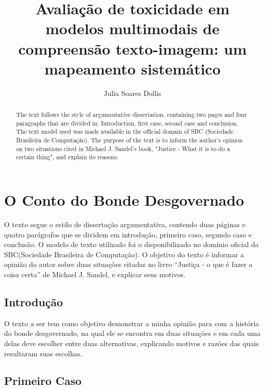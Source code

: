 \documentclass[12pt]{article}
\title{Avaliação de toxicidade em modelos multimodais de compreensão texto-imagem: um mapeamento sistemático}
\author{Julia Soares Dollis\inst{1} }
\begin{document}
 

\maketitle

\section{O Conto do Bonde Desgovernado} 

\begin{abstract}
  The text follows the style of argumentative dissertation, containing two pages and     four paragraphs that are divided in: Introduction, first case, second case and         conclusion. The text model used was made available in the official domain of SBC       (Sociedade Brasileira de Computação). The purpose of the text is to inform the         author's opinion on two situations cited in Michael J. Sandel's book, "Justice -       What it is to do a certain thing", and explain its reasons.
\end{abstract}
     
\begin{resumo} 
  O texto segue o estilo de dissertação argumentativa, contendo duas páginas e quatro   parágrafos que se dividem em introdução, primeiro caso, segundo caso e                 conclusão. O modelo de texto utilizado foi o disponibilizado no domínio               oficial  da SBC(Sociedade Brasileira de Computação). O objetivo do texto é             informar a  opinião do autor sobre duas situações citadas no livro “Justiça - o que   é fazer a coisa certa” de Michael J. Sandel, e explicar seus motivos.
\end{resumo}


\subsection{Introdução}

O texto a ser tem como objetivo demonstrar a minha opinião para com a história do   bonde desgovernado, na qual ele se encontra em duas situações e em cada uma delas   deve escolher entre duas alternativas, explicando motivos e razões das quais         resultaram suas escolhas.

\subsection{Primeiro Caso} \label{sec:firstpage}
\end{document}
